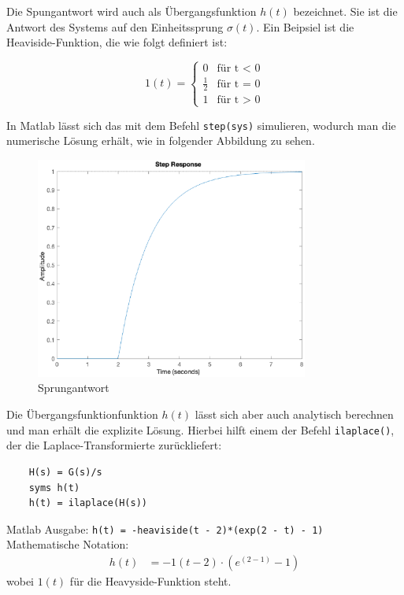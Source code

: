 Die Spungantwort wird auch als Übergangsfunktion $h(t)$ bezeichnet.
Sie ist die Antwort des Systems auf den Einheitssprung $\sigma (t)$.
Ein Beipsiel ist die Heaviside-Funktion, die wie folgt definiert ist:

\[
1 (t) = \begin{cases} 
    0 & \text{für t < 0} \\ 
    \frac{1}{2} & \text{für t = 0} \\
    1 & \text{für t > 0} \end{cases}  
\]

In Matlab lässt sich das mit dem Befehl \texttt{step(sys)} simulieren, wodurch man die numerische Lösung erhält, wie in folgender Abbildung zu sehen.

\begin{figure}[H]
    \label{fig:sprung}
    \centering
    \includegraphics[width=0.8\textwidth]{Bilder/SprungantwortPT1Tt.eps}
    \caption{Sprungantwort}
 \end{figure}

Die Übergangsfunktionfunktion $h(t)$ lässt sich aber auch analytisch berechnen und man erhält die explizite Lösung. Hierbei hilft einem der Befehl \texttt{ilaplace()}, der die Laplace-Transformierte zurückliefert:

\begin{verbatim}
    H(s) = G(s)/s
    syms h(t)
    h(t) = ilaplace(H(s))
\end{verbatim} 

Matlab Ausgabe: \texttt{h(t) = -heaviside(t - 2)*(exp(2 - t) - 1)}\\
Mathematische Notation: 
\begin{align*}
    h(t) &= -1(t-2)\cdot(e^{(2-1)}-1)
\end{align*} wobei $1(t)$ für die Heavyside-Funktion steht.


